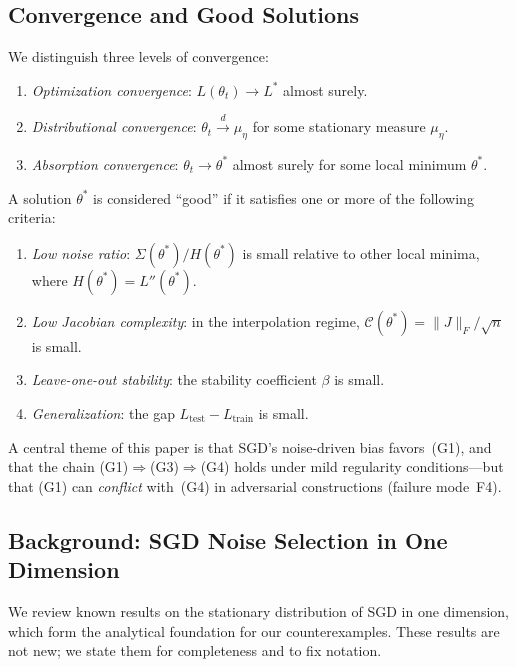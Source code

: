 \documentclass[11pt,a4paper]{article}
\begin{document}
\subsection{Convergence and Good Solutions}
\label{sec:convergence}

We distinguish three levels of convergence:
\begin{enumerate}[label=(C\arabic*)]
  \item \emph{Optimization convergence}: $L(\theta_t) \to L^*$ almost surely.
  \item \emph{Distributional convergence}: $\theta_t \xrightarrow{d} \mu_\eta$
        for some stationary measure $\mu_\eta$.
  \item \emph{Absorption convergence}: $\theta_t \to \theta^*$ almost surely
        for some local minimum $\theta^*$.
\end{enumerate}

A solution $\theta^*$ is considered ``good'' if it satisfies one or more of
the following criteria:
\begin{enumerate}[label=(G\arabic*)]
  \item \emph{Low noise ratio}: $\Sigma(\theta^*)/H(\theta^*)$ is small
        relative to other local minima, where $H(\theta^*) = L''(\theta^*)$.
  \item \emph{Low Jacobian complexity}: in the interpolation regime,
        $\mathcal{C}(\theta^*) = \|J\|_F / \sqrt{n}$ is small.
  \item \emph{Leave-one-out stability}: the stability coefficient $\beta$ is
        small.
  \item \emph{Generalization}: the gap $L_{\mathrm{test}} - L_{\mathrm{train}}$
        is small.
\end{enumerate}
A central theme of this paper is that SGD's noise-driven bias favors~(G1),
and that the chain (G1)$\Rightarrow$(G3)$\Rightarrow$(G4) holds under mild
regularity conditions---but that (G1) can \emph{conflict} with~(G4) in
adversarial constructions (failure mode~F4).

\subsection{Background: SGD Noise Selection in One Dimension}
\label{sec:background-1d}

We review known results on the stationary distribution of SGD in one
dimension, which form the analytical foundation for our counterexamples.
These results are not new; we state them for completeness and to fix notation.
\end{document}
